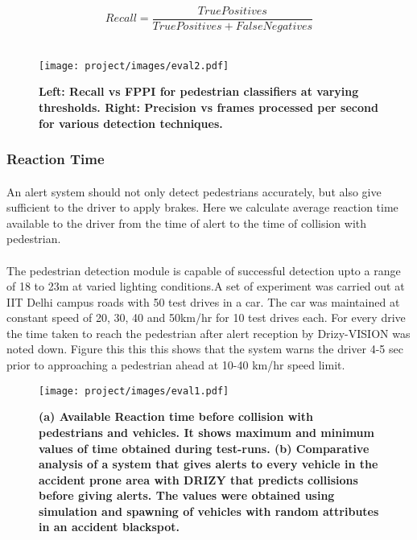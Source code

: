 \begin{equation}
    Recall = \frac{True Positives}{True Positives + False Negatives}
    \label{eq2}
\end{equation}\\

\begin{figure}
\centering
{
\texttt{[image: project/images/eval2.pdf]}
\caption{\textbf{Left: Recall vs FPPI for pedestrian classifiers at varying thresholds. Right: Precision vs frames processed per second for various detection techniques.}}
\label{fig:eval2}
}
\end{figure}
\subsubsection{Reaction Time}
\paragraph{}An alert system should not only detect pedestrians accurately, but also give sufficient to the driver to apply brakes. Here we calculate average reaction time available to the driver from the time of alert to the time of collision with pedestrian.
\paragraph{}The pedestrian detection module is capable of successful detection upto a range of 18 to 23m at varied lighting conditions.A set of experiment was carried out at IIT Delhi campus roads with 50 test drives in a car. The car was maintained at constant speed of 20, 30, 40 and 50km/hr for 10 test drives each. For every drive the time taken to reach the pedestrian after alert reception by Drizy-VISION was noted down. Figure this this this shows that the system warns the driver 4-5 sec prior to approaching a pedestrian ahead at 10-40 km/hr speed limit.
\begin{figure}[hbtp]
\centering
{
\texttt{[image: project/images/eval1.pdf]}
\caption{\textbf{(a) Available Reaction time before collision with pedestrians and vehicles. It shows maximum and minimum values of time obtained during test-runs. (b) Comparative analysis of a system that gives alerts to every vehicle in the accident prone area with DRIZY that predicts collisions before giving alerts. The values were obtained using simulation and spawning of vehicles with random attributes in an accident blackspot.}}
\label{fig:eval1}
}
\end{figure}
